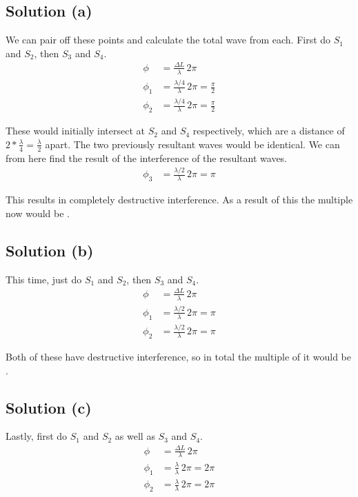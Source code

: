 \documentclass[12pt]{article}
\begin{document}
        \subsection{Solution (a)}
            We can pair off these points and calculate the total wave from each.
            First do $S_1$ and $S_2$, then $S_3$ and $S_4$.
            \begin{align}
                \phi    &=  \frac{\Delta L}{\lambda}\,2\pi\\
                \phi_1  &=  \frac{\lambda/4}{\lambda}\,2\pi
                    =   \frac{\pi}{2}\\
                \phi_2  &=  \frac{\lambda/4}{\lambda}\,2\pi
                    =   \frac{\pi}{2}
            \end{align}

            These would initially intersect at $S_2$ and $S_4$ respectively, which are a distance of $2 * \frac{\lambda}{4} = \frac{\lambda}{2}$ apart.
            The two previously resultant waves would be identical.
            We can from here find the result of the interference of the resultant waves.
            \begin{align}
                \phi_3  &=  \frac{\lambda/2}{\lambda}\,2\pi
                    =   \pi
            \end{align}

            This results in completely destructive interference.
            As a result of this the multiple now would be .

        \subsection{Solution (b)}
            This time, just do $S_1$ and $S_2$, then $S_3$ and $S_4$.
            \begin{align}
                \phi    &=  \frac{\Delta L}{\lambda}\,2\pi\\
                \phi_1  &=  \frac{\lambda/2}{\lambda}\,2\pi
                    =   \pi\\
                \phi_2  &=  \frac{\lambda/2}{\lambda}\,2\pi
                    =   \pi
            \end{align}

            Both of these have destructive interference, so in total the multiple of it would be .

        \subsection{Solution (c)}
            Lastly, first do $S_1$ and $S_2$ as well as $S_3$ and $S_4$.
            \begin{align}
                \phi    &=  \frac{\Delta L}{\lambda}\,2\pi\\
                \phi_1  &=  \frac{\lambda}{\lambda}\,2\pi
                    =   2\pi\\
                \phi_2  &=  \frac{\lambda}{\lambda}\,2\pi
                    =   2\pi
            \end{align}
\end{document}
